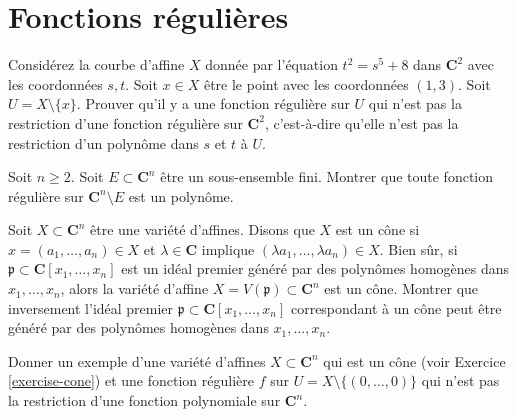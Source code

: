 \section{Fonctions régulières}
\label{section-regular-functions}

\begin{exercise}
\label{exercise-extra-function}
Considérez la courbe d'affine $X$ donnée par l'équation $t^2 =
s^5 + 8$ dans $\mathbf{C}^2$ avec les coordonnées $s, t$. Soit
$x \in X$ être le point avec les coordonnées $(1,
3)$. Soit $U = X \setminus \{x\}$. Prouver qu'il y
a une fonction régulière sur $U$ qui n'est pas la
restriction d'une fonction régulière sur $\mathbf{C}^2$, c'est-à-dire qu'elle n'est pas
la restriction d'un polynôme dans $s$ et $t$ à $U$.
\end{exercise}

\begin{exercise}
\label{exercise-no-extra-function}
Soit $n \geq 2$. Soit $E \subset \mathbf{C}^n$ être un sous-ensemble
fini. Montrer que toute fonction régulière sur $\mathbf{C}^n \setminus E$
est un polynôme.
\end{exercise}

\begin{exercise}
\label{exercise-cone}
Soit $X \subset \mathbf{C}^n$ être une variété d'affines. Disons que $X$
est un cône {\it} si $x = (a_1, \ldots, a_n) \in X$
et $\lambda \in \mathbf{C}$ implique $(\lambda a_1, \ldots, \lambda
a_n) \in X$. Bien sûr, si $\mathfrak p \subset \mathbf{C}[x_1,
\ldots, x_n]$ est un idéal premier généré par des polynômes homogènes dans $x_1,
\ldots, x_n$, alors la variété d'affine $X = V(\mathfrak p) \subset \mathbf{C}^n$
est un cône. Montrer que inversement
l'idéal premier $\mathfrak p \subset \mathbf{C}[x_1, \ldots, x_n]$
correspondant à un cône peut être généré par des polynômes homogènes
dans $x_1, \ldots, x_n$.
\end{exercise}

\begin{exercise}
\label{exercise-extra-function-cone}
Donner un exemple d'une variété d'affines $X \subset \mathbf{C}^n$ qui
est un cône (voir Exercice \ref{exercise-cone}) et
une fonction régulière $f$ sur $U = X \setminus \{(0, \ldots,
0)\}$ qui n'est pas la restriction d'une
fonction polynomiale sur $\mathbf{C}^n$.
\end{exercise}

